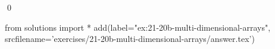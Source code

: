 
\begin{ex} 
  \label{ex:21-20b-multi-dimensional-arrays}
  
  \qed
\end{ex} 
\begin{python0}
from solutions import *
add(label="ex:21-20b-multi-dimensional-arrays",
    srcfilename='exercises/21-20b-multi-dimensional-arrays/answer.tex') 
\end{python0}

